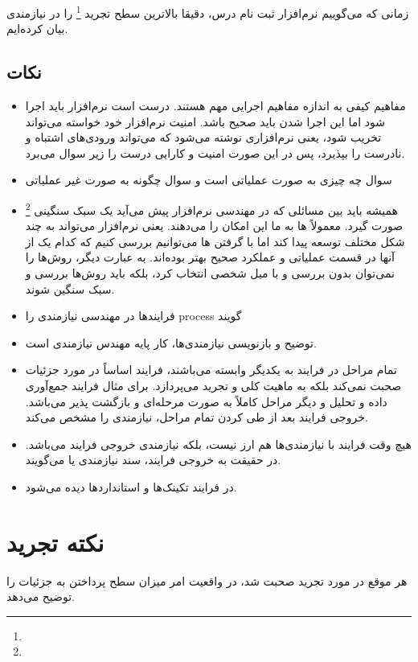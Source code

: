 \documentclass[a4paper]{article}
\begin{document}
زمانی که می‌گوییم نرم‌افزار ثبت نام درس، دقیقا بالاترین سطح تجرید
\footnote{} را در نیازمندی بیان کرده‌ایم.

\subsection*{نکات}

\begin{itemize}
  \item مفاهیم کیفی به اندازه مفاهیم اجرایی مهم هستند. درست است نرم‌افزار باید
  اجرا شود اما این اجرا شدن باید صحیح باشد. امنیت نرم‌افزار خود خواسته می‌تواند
  تخریب شود، یعنی نرم‌افزاری نوشته می‌شود که می‌تواند ورودی‌های اشتباه و نادرست
  را بپذیرد، پس در این صورت امنیت و کارایی درست را زیر سوال می‌برد.
  \item سوال چه چیزی به صورت عملیاتی است و سوال چگونه به صورت غیر عملیاتی
  \item همیشه باید بین مسائلی که در مهندسی نرم‌افزار پیش می‌آید یک سبک سنگینی
  \footnote{} صورت گیرد. معمولاً  ها به ما این
  امکان را می‌دهند. یعنی نرم‌افزار می‌تواند به چند شکل مختلف توسعه پیدا کند اما
  با گرفتن  ها می‌توانیم بررسی کنیم که کدام یک از آنها در قسمت
  عملیاتی و عملکرد صحیح بهتر بوده‌اند. به عبارت دیگر، روش‌ها را نمی‌توان بدون
  بررسی و با میل شخصی انتخاب کرد، بلکه باید روش‌ها بررسی و سبک سنگین شوند.
  \item فرایند‌ها در مهندسی نیازمندی را process گویند
  \item توضیح و بازنویسی نیازمندی‌ها، کار پایه مهندس نیازمندی است.
  \item تمام مراحل در فرایند به یکدیگر وابسته می‌باشند، فرایند اساساً در مورد
  جزئیات صحبت نمی‌کند بلکه به ماهیت کلی و تجرید می‌پردازد. برای مثال فرایند
  جمع‌آوری داده و تحلیل و دیگر مراحل کاملاً به صورت مرحله‌ای و بازگشت پذیر
  می‌باشد. خروجی فرایند بعد از طی کردن تمام مراحل، نیازمندی را مشخص می‌کند.
  \item هیچ وقت فرایند با نیازمندی‌ها هم ارز نیست، بلکه نیازمندی خروجی فرایند
  می‌باشد. در حقیقت به خروجی فرایند، سند نیازمندی یا  می‌گویند.
  \item در فرایند تکینک‌ها و استاندارد‌ها دیده می‌شود.
\end{itemize}

\section{نکته تجرید}

هر موقع در مورد تجرید صحبت شد، در واقعیت امر میزان سطح پرداختن به جزئیات را
توضیح می‌دهد.
\end{document}
